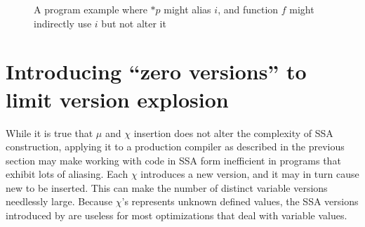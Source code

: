 \begin{figure}
%
%
\caption{\label{fig:hssa:muchi}A program example where $*p$ might alias $i$, and function $f$ might indirectly use $i$ but not alter it}
\end{figure}


\section{Introducing ``zero versions'' to limit version explosion}

While it is true that $\mu$ and $\chi$ insertion does not alter the complexity of SSA construction, applying it to a production compiler as described in the previous section may make working with code in SSA form inefficient in programs that exhibit lots of aliasing.
Each $\chi$ introduces a new version, and it may in turn cause new \phifuns to be inserted.
This can make the number of distinct variable versions needlessly large.
Because $\chi$'s represents unknown defined values, the SSA versions introduced
by \chiops are useless for most optimizations that deal with variable values.

